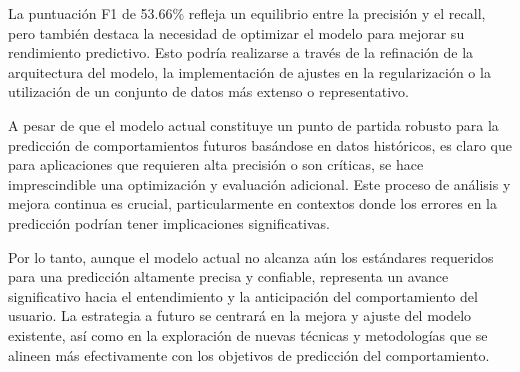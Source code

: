 La puntuación F1 de 53.66\% refleja un equilibrio entre la precisión y el recall, pero también destaca la necesidad de optimizar el modelo para mejorar su rendimiento predictivo. Esto podría realizarse a través de la refinación de la arquitectura del modelo, la implementación de ajustes en la regularización o la utilización de un conjunto de datos más extenso o representativo.

A pesar de que el modelo actual constituye un punto de partida robusto para la predicción de comportamientos futuros basándose en datos históricos, es claro que para aplicaciones que requieren alta precisión o son críticas, se hace imprescindible una optimización y evaluación adicional. Este proceso de análisis y mejora continua es crucial, particularmente en contextos donde los errores en la predicción podrían tener implicaciones significativas.

Por lo tanto, aunque el modelo actual no alcanza aún los estándares requeridos para una predicción altamente precisa y confiable, representa un avance significativo hacia el entendimiento y la anticipación del comportamiento del usuario. La estrategia a futuro se centrará en la mejora y ajuste del modelo existente, así como en la exploración de nuevas técnicas y metodologías que se alineen más efectivamente con los objetivos de predicción del comportamiento.